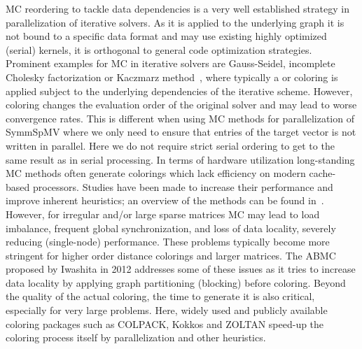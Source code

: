
\Acrfull{MC} reordering to tackle data dependencies is a very well established strategy in parallelization of iterative solvers. As it is applied to the underlying graph it is not bound to a specific data format and may use existing highly optimized (serial) kernels, \ie it is orthogonal to general code optimization strategies.  
Prominent examples for  \acrshort{MC} in iterative solvers are Gauss-Seidel, incomplete 
Cholesky factorization or Kaczmarz method~\cite{RBGS,MC,feast_mc}, where typically a \DONE or \DTWO coloring is applied subject to the underlying dependencies of the iterative scheme. However, coloring changes the evaluation order of the original solver and may lead to worse convergence rates. This is different when using  \acrshort{MC} methods for parallelization of \acrshort{SymmSpMV} where we only need to ensure that entries of the target vector is not written in parallel. Here we do not  require strict serial ordering to get to the same result as in serial processing.
In terms of hardware utilization long-standing \acrshort{MC} methods often generate colorings which lack efficiency on modern cache-based
processors. Studies have been made to increase their
performance and improve inherent heuristics; an overview of the methods can be found in~\cite{gebremedhin2000scalable,dist_k_def,COLPACK,equitable_color}. However, 
for irregular and/or large sparse 
matrices \acrshort{MC} may lead to load imbalance, frequent global synchronization, 
and loss of data locality, severely reducing (single-node) performance. 
These problems typically become more stringent for higher order distance
colorings and larger matrices.
The \acrfull{ABMC}~\cite{ABMC} proposed by Iwashita \etal in 2012 addresses some of these issues as it tries to increase data locality by applying graph partitioning (blocking) before coloring. 
Beyond the quality of the actual coloring, the time to generate it is also critical, especially for very large problems. Here, widely used and publicly available coloring packages such as COLPACK\cite{COLPACK}, Kokkos\cite{kokkos} and ZOLTAN\cite{BOZDAG2008515,doi:10.1137/080732158} speed-up the coloring process itself by parallelization and other heuristics. 

